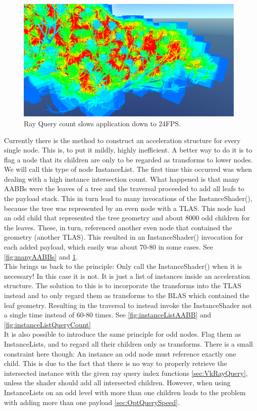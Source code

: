 \begin{figure}
    \centering
    \includegraphics[width=.8\textwidth]{images/showcase/ManyAABBsQuery24FPS.PNG}
    \caption{Ray Query count slows application down to 24FPS.}
    \label{fig:manyAABBQueryCount}
\end{figure}
Currently there is the method to construct an acceleration structure for every single node. This is, to put it mildly, highly inefficient. A better way to do it is to flag a node that its children are only to be regarded as transforms to lower nodes. We will call this type of node InstanceList. The first time this occurred was when dealing with a high instance intersection count. What happened is that many AABBs were the leaves of a tree and the traversal proceeded to add all leafs to the payload stack. This in turn lead to many invocations of the InstanceShader(), because the tree was represented by an even node with a TLAS. This node had an odd child that represented the tree geometry and about 8000 odd children for the leaves. These, in turn, referenced another even node that contained the geometry (another TLAS). This resulted in an  InstanceShader() invocation for each added payload, which easily was about 70-80 in some cases. See \ref{fig:manyAABBs} and \ref{fig:manyAABBQueryCount}.\\
This brings us back to the principle: Only call the InstanceShader() when it is necessary! In this case it is not. It is just a list of instances inside an acceleration structure. The solution to this is to incorporate the transforms into the TLAS instead and to only regard them as transforms to the BLAS which contained the leaf geometry. Resulting in the traversal to instead invoke the InstanceShader not a single time instead of 60-80 times. See \ref{fig:instanceListAABB} and \ref{fig:instanceListQueryCount}\\
It is also possible to introduce the same principle for odd nodes. Flag them as InstanceLists, and to regard all their children only as transforms. There is a small constraint here though: An instance an odd node must reference exactly one child. This is due to the fact that there is no way to properly retrieve the intersected instance with the given ray query index functions \ref{sec:VkRayQuery}, unless the shader should add all intersected children. However, when using InstanceLists on an odd level with more than one children leads to the problem with adding more than one payload \ref{sec:OptQuerySpeed}.
